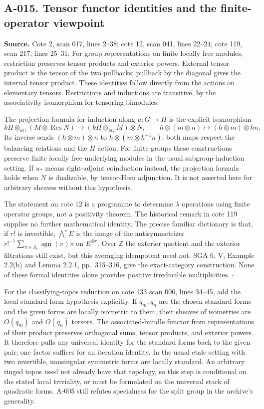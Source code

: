 \subsection*{A-015. Tensor functor identities and the finite-operator viewpoint}
\textbf{Source.} Cote 2, scan 017, lines 2--38; cote 12, scan 041,
lines 22--24; cote 119, scan 217, lines 25--31.
For group representations on finite locally free modules,
restriction preserves tensor products and exterior powers. External
tensor product is the tensor of the two pullbacks; pullback by the
diagonal gives the internal tensor product. These identities follow
directly from the actions on elementary tensors. Restrictions and
inductions are transitive, by the associativity isomorphism for
tensoring bimodules.

The projection formula for induction along $u:G\to H$ is the explicit
isomorphism
\[
 kH\otimes_{kG}(M\otimes\operatorname{Res}N)
 \longrightarrow(kH\otimes_{kG}M)\otimes N,
 \qquad h\otimes(m\otimes n)\longmapsto(h\otimes m)\otimes hn.
\]
Its inverse sends $(h\otimes m)\otimes n$ to
$h\otimes(m\otimes h^{-1}n)$; both maps respect the balancing
relations and the $H$ action. For finite groups these constructions
preserve finite locally free underlying modules in the usual
subgroup-induction setting. If $u_*$ means right-adjoint
coinduction instead, the projection formula holds when $N$ is
dualizable, by tensor-Hom adjunction. It is not asserted here for
arbitrary sheaves without this hypothesis.

The statement on cote 12 is a programme to determine $\lambda$
operations using finite operator groups, not a positivity theorem.
The historical remark in cote 119 supplies no further mathematical
identity. The precise familiar dictionary is that, if $r!$ is
invertible, $\bigwedge^r E$ is the image of the antisymmetrizer
$r!^{-1}\sum_{\pi\in S_r}\operatorname{sgn}(\pi)\pi$ on
$E^{\otimes r}$. Over $\mathbb Z$ the exterior quotient and the
exterior filtrations still exist, but this averaging idempotent
need not. SGA 6, V, Example 2.2(b) and Lemma 2.2.1, pp.~315--316,
give the exact-category construction. None of these formal
identities alone provides positive irreducible multiplicities.
\hfill$\square$

For the classifying-topos reduction on cote 133 scan 006, lines
34--45, add the local-standard-form hypothesis explicitly. If
$q_m,q_n$ are the chosen standard forms and the given forms are
locally isometric to them, their sheaves of isometries are
$O(q_m)$ and $O(q_n)$ torsors. The associated-bundle functor from
representations of their product preserves orthogonal sums,
tensor products, and exterior powers. It therefore pulls any
universal identity for the standard forms back to the given pair;
one factor suffices for an iteration identity. In the usual etale
setting with two invertible, nonsingular symmetric forms are
locally standard. An arbitrary ringed topos need not already have
that topology, so this step is conditional on the stated local
triviality, or must be formulated on the universal stack of
quadratic forms. A-005 still refutes specialness for the split
group in the archive's generality.

